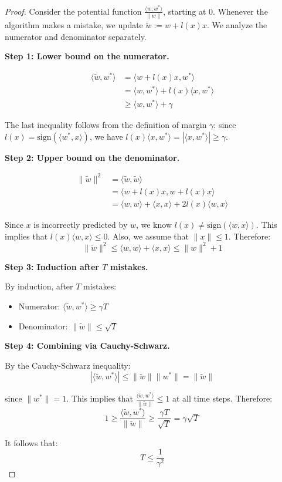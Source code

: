 \documentclass[main.tex]{subfiles}
\begin{document}
\begin{proof}
Consider the potential function $\frac{\langle w, w^* \rangle}{\|w\|}$, starting at $0$. Whenever the algorithm makes a mistake, we update $\tilde{w} := w + l(x)x$. We analyze the numerator and denominator separately.

\textbf{Step 1: Lower bound on the numerator.}

\begin{align}
\langle \tilde{w}, w^* \rangle &= \langle w + l(x)x, w^* \rangle \\[6pt]
&= \langle w, w^* \rangle + l(x)\langle x, w^* \rangle \\[6pt]
&\geq \langle w, w^* \rangle + \gamma
\end{align}

The last inequality follows from the definition of margin $\gamma$: since $l(x) = \text{sign}(\langle w^*, x \rangle)$, we have $l(x)\langle x, w^* \rangle = |\langle x, w^* \rangle| \geq \gamma$.

\textbf{Step 2: Upper bound on the denominator.}

\begin{align}
\|\tilde{w}\|^2 &= \langle \tilde{w}, \tilde{w} \rangle \\[6pt]
&= \langle w + l(x)x, w + l(x)x \rangle \\[6pt]
&= \langle w, w \rangle + \langle x, x \rangle + 2l(x)\langle w, x \rangle
\end{align}

Since $x$ is incorrectly predicted by $w$, we know $l(x) \neq \text{sign}(\langle w, x \rangle)$. This implies that $l(x)\langle w, x \rangle \leq 0$. Also, we assume that $\|x\| \leq 1$. Therefore:
$$\|\tilde{w}\|^2 \leq \langle w, w \rangle + \langle x, x \rangle \leq \|w\|^2 + 1$$

\textbf{Step 3: Induction after $T$ mistakes.}

By induction, after $T$ mistakes:
\begin{itemize}
    \item Numerator: $\langle \tilde{w}, w^* \rangle \geq \gamma T$
    \item Denominator: $\|\tilde{w}\| \leq \sqrt{T}$
\end{itemize}

\textbf{Step 4: Combining via Cauchy-Schwarz.}

By the Cauchy-Schwarz inequality:
$$|\langle \tilde{w}, w^* \rangle| \leq \|\tilde{w}\| \|w^*\| = \|\tilde{w}\|$$

since $\|w^*\| = 1$. This implies that $\frac{\langle \tilde{w}, w^* \rangle}{\|\tilde{w}\|} \leq 1$ at all time steps. Therefore:
$$1 \geq \frac{\langle \tilde{w}, w^* \rangle}{\|\tilde{w}\|} \geq \frac{\gamma T}{\sqrt{T}} = \gamma\sqrt{T}$$

It follows that:
$$\boxed{T \leq \frac{1}{\gamma^2}}$$
\end{proof}
\end{document}
